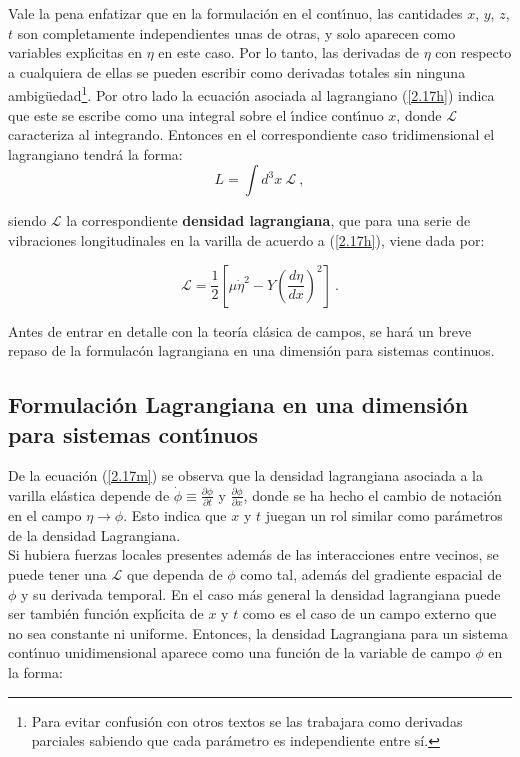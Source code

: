 \noindent
Vale la pena enfatizar que en la formulaci\'{o}n en el cont\'{\i}nuo, las cantidades $x$, $y$, $z$, $t$ son completamente independientes unas de otras, y solo aparecen como variables expl\'{\i}citas en $\eta$ en este caso. Por lo tanto, las derivadas de $\eta $ con respecto a cualquiera de ellas se pueden escribir como derivadas totales sin ninguna ambig\"{u}edad\footnote{Para evitar confusión con otros textos se las trabajara como derivadas parciales sabiendo que cada parámetro es independiente entre sí.}. Por otro lado la ecuaci\'{o}n asociada al lagrangiano (\ref{2.17h}) indica que este se escribe como una integral sobre el \'{\i}ndice cont\'{\i}nuo $x$, donde $\mathcal{L}$ caracteriza al integrando. Entonces en el correspondiente caso tridimensional el lagrangiano tendr\'{a} la forma:
\begin{equation}
L=\int d^{3}x\ \mathcal{L}~,  \label{2.17l}
\end{equation}

\noindent
siendo $\mathcal{L}$ la correspondiente \textbf{densidad lagrangiana}, que para una serie de vibraciones longitudinales en la varilla de acuerdo a (\ref{2.17h}), viene dada por:

\begin{equation}
\mathcal{L}=\frac{1}{2}\left[ \mu \dot{\eta}^{2}-Y\left( \frac{d\eta }{dx}\right) ^{2}\right] ~.  \label{2.17m}
\end{equation}

Antes de entrar en detalle con la teoría clásica de campos, se hará un breve repaso de la formulacón lagrangiana en una dimensión para sistemas continuos.

\vspace{1cm}
\subsection{Formulaci\'{o}n Lagrangiana en una dimensi\'{o}n para sistemas cont\'{\i}nuos}
\vspace{0.5cm}
De la ecuaci\'{o}n (\ref{2.17m}) se observa que la densidad lagrangiana asociada a la varilla el\'{a}stica depende de $\dot{\phi}\equiv \frac{\partial \phi }{\partial t}$ y $\frac{\partial \phi }{\partial x}$, donde se ha hecho el cambio de notación en el campo $\eta \rightarrow \phi$. Esto indica que $x$ y $t$ juegan un rol similar como par\'{a}metros de la densidad Lagrangiana.\\
Si hubiera fuerzas locales presentes adem\'{a}s de las interacciones entre vecinos, se puede tener una $\mathcal{L}$ que dependa de $\phi$ como tal, adem\'{a}s del gradiente espacial de $\phi$ y su derivada
temporal. En el caso m\'{a}s general la densidad lagrangiana puede ser tambi\'{e}n funci\'{o}n expl\'{\i}cita de $x$ y $t$ como es el caso de un campo externo que no sea constante ni uniforme. Entonces, la densidad Lagrangiana
para un sistema cont\'{\i}nuo unidimensional aparece como una funci\'{o}n de la variable de campo $\phi$ en la forma:

